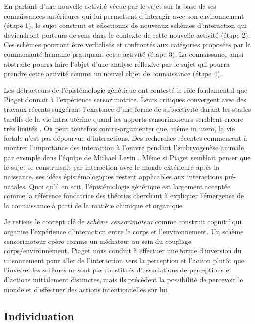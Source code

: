 En partant d'une nouvelle activité vécue par le sujet sur la base de ses connaissances antérieures qui lui permettent d'interagir avec son environnement (étape 1), le sujet construit et sélectionne de nouveaux schèmes d'interaction qui deviendront porteurs de sens dans le contexte de cette nouvelle activité (étape 2). 
Ces schèmes pourront être verbalisés et confrontés aux catégories proposées par la communauté humaine pratiquant cette activité (étape 3). 
La connaissance ainsi abstraite pourra faire l’objet d’une analyse réflexive par le sujet qui pourra prendre cette activité comme un nouvel objet de connaissance (étape 4).

Les détracteurs de l'épistémologie génétique ont contesté le rôle fondamental que Piaget donnait à l'expérience sensorimotrice.
Leurs critiques convergent avec des travaux récents suggérant l'existence d'une forme de subjectivité durant les stades tardifs de la vie intra utérine quand les apports sensorimoteurs semblent encore très limités \cite{moser_magnetoencephalographic_2021}.
On peut toutefois contre-argumenter que, même in utero, la vie fœtale n'est pas dépourvue d'interactions. 
Des recherches récentes commencent à montrer l'importance des interaction à l'\oe uvre pendant l'embryogenèse animale, par exemple dans l'équipe de Michael Levin \cite{tung_embryos_2024}.
Même si Piaget semblait penser que le sujet se construisait par interaction avec le monde extérieure après la naissance, ses idées épistémologiques restent applicables aux interactions pré-natales. 
Quoi qu'il en soit, l'épistémologie génétique est largement acceptée comme la référence fondatrice des théories cherchant à expliquer l'émergence de la connaissance à parti de la matière chimique et organique. 

Je retiens le concept clé de \emph{schème sensorimoteur} comme construit cognitif qui organise l'expérience d'interaction entre le corps et l'environnement.
Un schème sensorimoteur opère comme un médiateur au sein du couplage corps/environnement.
Piaget nous conduit à effectuer une forme d'inversion du raisonnement pour aller de l'interaction vers la perception et l'action plutôt que l'inverse:
les schèmes ne sont pas constitués d'associations de perceptions et d'actions initialement distinctes, mais ils précèdent la possibilité de percevoir le monde et d'effectuer des actions intentionnelles sur lui. 


\subsection{Individuation}


